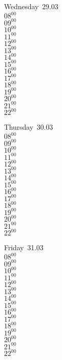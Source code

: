 \documentclass[11pt,a4paper]{book}\usepackage[]{graphicx}\usepackage[]{color}
\begin{document}
\begin{weekdaybox}
  Wednesday~29.03\\
  { 
  \vfill
  $08^{00}$\\
$09^{00}$\\
$10^{00}$\\
$11^{00}$\\
$12^{00}$\\
$13^{00}$\\
$14^{00}$\\
$15^{00}$\\
$16^{00}$\\
$17^{00}$\\
$18^{00}$\\
$19^{00}$\\
$20^{00}$\\
$21^{00}$\\
$22^{00}$\\
  }
\end{weekdaybox}
\clearpage
\begin{headerbox}
\end{headerbox}
\begin{weekdaybox}
  Thursday~30.03\\
  { 
  \vfill
  $08^{00}$\\
$09^{00}$\\
$10^{00}$\\
$11^{00}$\\
$12^{00}$\\
$13^{00}$\\
$14^{00}$\\
$15^{00}$\\
$16^{00}$\\
$17^{00}$\\
$18^{00}$\\
$19^{00}$\\
$20^{00}$\\
$21^{00}$\\
$22^{00}$\\
  }
\end{weekdaybox} 
\begin{weekdaybox}
  Friday~31.03\\
  { 
  \vfill
  $08^{00}$\\
$09^{00}$\\
$10^{00}$\\
$11^{00}$\\
$12^{00}$\\
$13^{00}$\\
$14^{00}$\\
$15^{00}$\\
$16^{00}$\\
$17^{00}$\\
$18^{00}$\\
$19^{00}$\\
$20^{00}$\\
$21^{00}$\\
$22^{00}$\\
  }
\end{weekdaybox}
\end{document}
